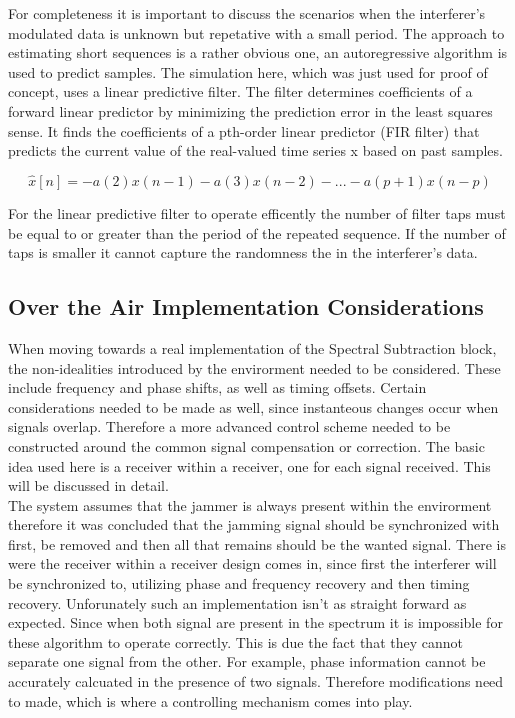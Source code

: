 For completeness it is important to discuss the scenarios when the interferer's modulated data is unknown but repetative with a small period.  The approach to estimating short sequences is a rather obvious one, an autoregressive algorithm is used to predict samples.  The simulation here, which was just used for proof of concept, uses a linear predictive filter.  The filter determines coefficients of a forward linear predictor by minimizing the prediction error in the least squares sense\cite{lpcfilter}.  It finds the coefficients of a pth-order linear predictor (FIR filter) that predicts the current value of the real-valued time series x based on past samples.

\[ \hat{x}[n]=-a(2)x(n-1)-a(3)x(n-2)-...-a(p+1)x(n-p)\]

For the linear predictive filter to operate efficently the number of filter taps must be equal to or greater than the period of the repeated sequence.  If the number of taps is smaller it cannot capture the randomness the in the interferer's data.\\

\subsection{Over the Air Implementation Considerations}

When moving towards a real implementation of the Spectral Subtraction block, the non-idealities introduced by the envirorment needed to be considered.  These include frequency and phase shifts, as well as timing offsets.  Certain considerations needed to be made as well, since instanteous changes occur when signals overlap.  Therefore a more advanced control scheme needed to be constructed around the common signal compensation or correction.  The basic idea used here is a receiver within a receiver, one for each signal received.  This will be discussed in detail.\\

The system assumes that the jammer is always present within the envirorment therefore it was concluded that the jamming signal should be synchronized with first, be removed and then all that remains should be the wanted signal.  There is were the receiver within a receiver design comes in, since first the interferer will be synchronized to, utilizing phase and frequency recovery and then timing recovery.  Unforunately such an implementation isn't as straight forward as expected.  Since when both signal are present in the spectrum it is impossible for these algorithm to operate correctly.  This is due the fact that they cannot separate one signal from the other.  For example, phase information cannot be accurately calcuated in the presence of two signals.  Therefore modifications need to made, which is where a controlling mechanism comes into play.\\

